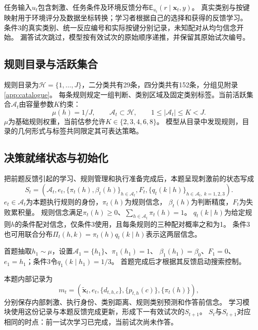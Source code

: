 \documentclass[11pt,a4paper]{article}
\numberwithin{equation}{section}
\newcommand{\A}{\mathcal{A}}
\newcommand{\Hh}{\mathcal{H}}
\newcommand{\Ee}{\mathsf{E}}
\begin{document}
任务输入$u_t$包含刺激、任务条件及环境反馈分布$\Ee_{u_t}(r\mid\bm x_t,y)$。
真实类别与按键映射用于环境评分及数据坐标转换；学习者根据自己的选择和获得的反馈学习。
条件3的真实类别、统一反应编号和实际按键分别记录，未知配对从均匀信念开始。
漏答试次跳过，模型按有效试次的原始顺序递推，并保留其原始试次编号。

\subsection{规则目录与活跃集合}
规则目录为$\Hh=\{1,\ldots,J\}$，二分类共有29条，四分类共有152条，分组见附录\ref{app:catalogue}。
每条规则规定一组判断、类别区域及固定类别标签。当前活跃集合$\A_t$由容量参数$K$约束：
\begin{equation}
\mu(h)=1/J,\qquad \A_t\subset\Hh,\qquad 1\leq|\A_t|\leq K<J.
\label{eq:capacity}
\end{equation}
$\mu$为基础规则权重，当前估参允许$K\in\{2,3,4,6,8\}$。
模型从目录中发现规则，目录的几何形式与标签共同限定其可表达策略。


\subsection{决策就绪状态与初始化}
把前题反馈引起的学习、规则管理和执行准备完成后，本题呈现刺激前的状态写成
\begin{equation}
S_t=\left(\A_t,e_t,\{\pi_t(h),\beta_t(h)\}_{h\in\A_t},F_t,
\{q_t(k\mid h)\}_{h\in\A_t,\ k=1,2,3}\right).
\label{eq:state}
\end{equation}
$e_t\in\A_t$为本题执行规则的身份，$\pi_t(h)$为规则信念，
$\beta_t(h)$为判断精度，$F_t$为失败累积量。
规则信念满足$\pi_t(h)\geq0$、$\sum_{h\in\A_t}\pi_t(h)=1$。
$q_t(k\mid h)$为给定规则$h$的条件配对信念，仅条件3使用，且每条规则的三种配对概率之和为1。
条件3也可用联合分布$\Pi_t(h,k)=\pi_t(h)q_t(k\mid h)$表示这两层信念。

首题抽取$h_1\sim\mu$，设置$\A_1=\{h_1\}$、$\pi_1(h_1)=1$、
$\beta_1(h_1)=\beta_0$、$F_1=0$、$e_1=h_1$；条件3令$q_1(k\mid h_1)=1/3$。
首题完成后才根据其反馈启动搜索控制。

本题内部记录为
\begin{equation}
m_t=\left(\widetilde{\bm x}_t,e_t,\{d_{t,h,c}\},\{p_{t,h}(c)\},\{\pi_t(h)\}\right),
\end{equation}
分别保存内部刺激、执行身份、类别距离、规则类别预测和作答前信念。
学习模块使用这份记录与本题反馈完成更新，形成下一有效试次的$S_{t+1}$。
$S_t$与$S_{t+1}$对应相同的时点：前一试次学习已完成，当前试次尚未作答。
\end{document}
